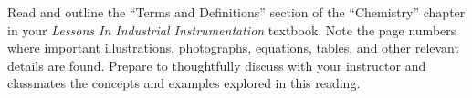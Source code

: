 
Read and outline the ``Terms and Definitions'' section of the ``Chemistry'' chapter in your {\it Lessons In Industrial Instrumentation} textbook.  Note the page numbers where important illustrations, photographs, equations, tables, and other relevant details are found.  Prepare to thoughtfully discuss with your instructor and classmates the concepts and examples explored in this reading.













